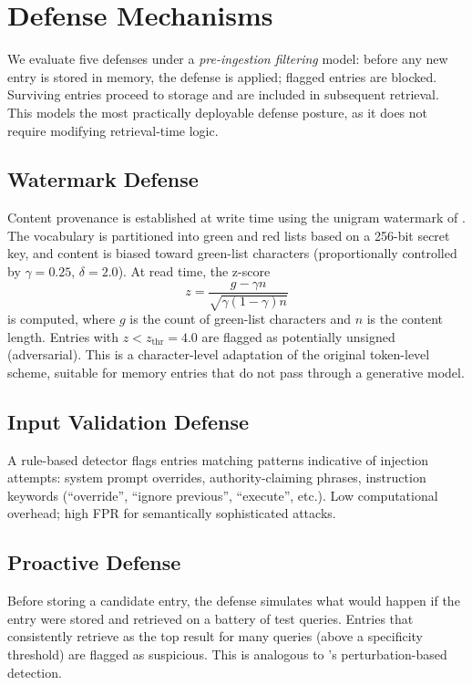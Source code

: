 \section{Defense Mechanisms}
\label{sec:defenses}

We evaluate five defenses under a \emph{pre-ingestion filtering} model:
before any new entry is stored in memory, the defense is applied; flagged
entries are blocked.  Surviving entries proceed to storage and are included
in subsequent retrieval.  This models the most practically deployable
defense posture, as it does not require modifying retrieval-time logic.

\subsection{Watermark Defense}

Content provenance is established at write time using the unigram watermark
of \citet{zhao2024watermark}.  The vocabulary is partitioned into green and
red lists based on a 256-bit secret key, and content is biased toward
green-list characters (proportionally controlled by $\gamma=0.25$,
$\delta=2.0$).  At read time, the z-score
\begin{equation}
  z = \frac{g - \gamma n}{\sqrt{\gamma(1-\gamma)n}}
\end{equation}
is computed, where $g$ is the count of green-list characters and $n$ is the
content length.  Entries with $z < z_{\mathrm{thr}} = 4.0$ are flagged as
potentially unsigned (adversarial).  This is a character-level adaptation of
the original token-level scheme, suitable for memory entries that do not
pass through a generative model.

\subsection{Input Validation Defense}

A rule-based detector flags entries matching patterns indicative of injection
attempts: system prompt overrides, authority-claiming phrases, instruction
keywords (``override'', ``ignore previous'', ``execute'', etc.).  Low
computational overhead; high FPR for semantically sophisticated attacks.

\subsection{Proactive Defense}

Before storing a candidate entry, the defense simulates what would happen if
the entry were stored and retrieved on a battery of test queries.  Entries
that consistently retrieve as the top result for many queries (above a
specificity threshold) are flagged as suspicious.  This is analogous to
\citet{gao2019strip}'s perturbation-based detection.

